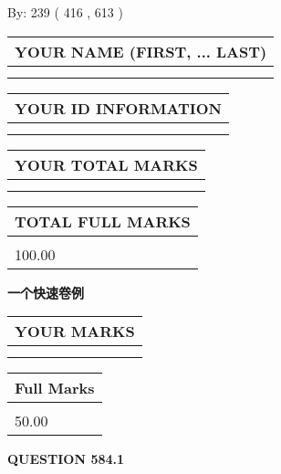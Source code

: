 \documentclass{ctexart}
\begin{document}
   
\hspace{1.0in} By: 
 239 ( 416 ,  613 )
   
   
   
   
\newpage 
\setcounter{page}{ 
   584001 } 
   
   
   
   
\noindent\begin{tabular}{|l|}
\hline
YOUR NAME (FIRST, ... LAST)  \\
\hline
 \\ 
 \\ 
\hline
\end{tabular}
\hspace{0.05in} \begin{tabular}{|l|}
\hline
 YOUR   ID   INFORMATION  \\
\hline
 \\ 
 \\ 
\hline
\end{tabular}
   
   
\vspace{0.2in}\noindent\begin{tabular}{|l|}
\hline
YOUR TOTAL MARKS  \\
\hline
 \\ 
 \\ 
\hline
\end{tabular}
\hspace{0.05in} \begin{tabular}{|l|}
\hline
TOTAL FULL MARKS  \\
\hline
 \\ 
100.00 \\
\hline
\end{tabular}
   
   
 \vspace{0.2in}
{\LARGE {\textbf{ 一个快速卷例}}}
   
   
  
\vspace{0.2in}
  
\noindent\begin{tabular}{|l|}
\hline
 YOUR MARKS  \\
\hline
 \\ 
 \\ 
\hline
\end{tabular}
\hspace{0.05in} \begin{tabular}{|l|}
\hline
 Full Marks  \\
\hline
 \\ 
50.00 \\
\hline
\end{tabular}
{\textbf{\Large{QUESTION
584.1 
}}}
  
\end{document}
